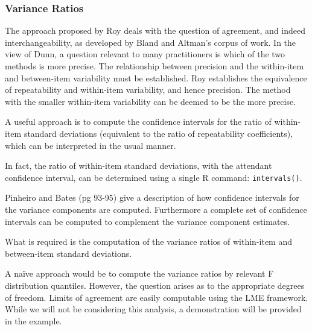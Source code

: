 \documentclass[12pt, a4paper]{report}
\theoremstyle{plain}
\theoremstyle{definition}
\theoremstyle{remark}
\begin{document}
	
	

	\subsubsection{Variance Ratios}
	The approach proposed by Roy deals with the question of agreement, and indeed interchangeability, as developed by Bland and Altman’s corpus of work.  In the view of Dunn, a question relevant to many practitioners is which of the two methods is more precise.
	The relationship between precision and the within-item and between-item variability must be established. Roy establishes the equivalence of repeatability and within-item variability, and hence precision.  The method with the smaller within-item variability can be deemed to be the more precise.
	
	A useful approach is to compute the confidence intervals for the ratio of within-item standard deviations (equivalent to the ratio of repeatability coefficients), which can be interpreted in the usual manner.  
	
	In fact, the ratio of within-item standard deviations, with the attendant confidence interval,  can be determined using a single R command: \texttt{intervals()}.
	
	Pinheiro and Bates (pg 93-95) give a description of how confidence intervals for the variance components are computed. Furthermore a complete set of confidence intervals can be computed to complement the variance component estimates. 
	
	What is required is the computation of the variance ratios of within-item and between-item standard deviations.  
	
	A naïve approach would be to compute the variance ratios by relevant F distribution quantiles. However, the question arises as to the appropriate degrees of freedom.
	Limits of agreement are easily computable using the LME framework. While we will not be considering this analysis, a demonstration will be provided in the example.
	
	
	
	
	
\end{document}

